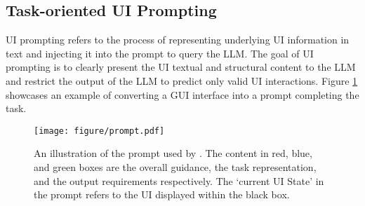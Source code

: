 \subsection{Task-oriented UI Prompting}
\label{section: prompting}

UI prompting refers to the process of representing underlying UI information in text and injecting it into the prompt to query the LLM. 
The goal of UI prompting is to clearly present the UI textual and structural content to the LLM and restrict the output of the LLM to predict only valid UI interactions. %
Figure \ref{fig:prompt} showcases an example of \name converting a GUI interface into a prompt  completing the task.

\begin{figure}
    \centering
    \texttt{[image: figure/prompt.pdf]}
    \vspace{-0.3cm}
    \caption{An illustration of the prompt used by \name. The content in red, blue, and green boxes are the overall guidance, the task representation, and the output requirements respectively. The `current UI State' in the prompt refers to the UI displayed within the black box.}
    \label{fig:prompt}
    \vspace{-0.2cm}
\end{figure}

